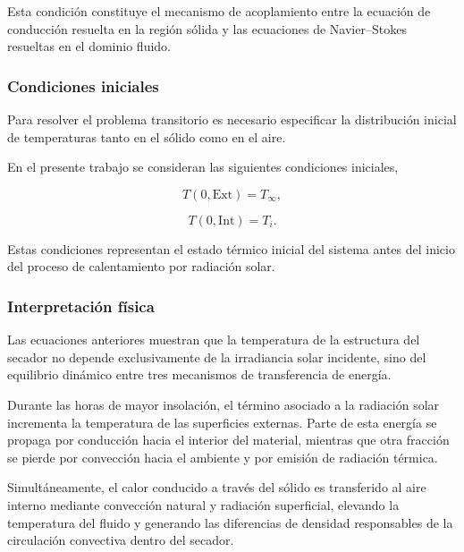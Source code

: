 Esta condición constituye el mecanismo de acoplamiento entre la ecuación de conducción resuelta en la región sólida y las ecuaciones de Navier--Stokes resueltas en el dominio fluido.

\subsubsection{Condiciones iniciales}

Para resolver el problema transitorio es necesario especificar la distribución inicial de temperaturas tanto en el sólido como en el aire.

En el presente trabajo se consideran las siguientes condiciones iniciales,

\begin{equation}
T(0,\mathrm{Ext})=T_\infty,
\label{eqn:inicialexterna}
\end{equation}

\begin{equation}
T(0,\mathrm{Int})=T_i.
\label{eqn:inicialinterna}
\end{equation}

Estas condiciones representan el estado térmico inicial del sistema antes del inicio del proceso de calentamiento por radiación solar.

\subsubsection{Interpretación física}

Las ecuaciones anteriores muestran que la temperatura de la estructura del secador no depende exclusivamente de la irradiancia solar incidente, sino del equilibrio dinámico entre tres mecanismos de transferencia de energía.

Durante las horas de mayor insolación, el término asociado a la radiación solar incrementa la temperatura de las superficies externas. Parte de esta energía se propaga por conducción hacia el interior del material, mientras que otra fracción se pierde por convección hacia el ambiente y por emisión de radiación térmica.

Simultáneamente, el calor conducido a través del sólido es transferido al aire interno mediante convección natural y radiación superficial, elevando la temperatura del fluido y generando las diferencias de densidad responsables de la circulación convectiva dentro del secador.

